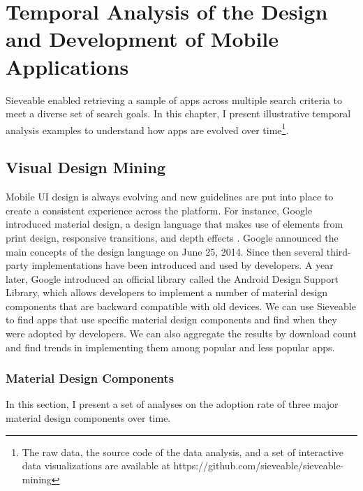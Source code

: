 \chapter{Temporal Analysis of the Design and Development of Mobile Applications}
\label{ch:findings_chapter}
Sieveable enabled retrieving a sample of apps across multiple search criteria to meet a diverse set of search goals.
In this chapter, I present illustrative temporal analysis examples to understand how apps are evolved over time\footnote{The raw data, the source code of the data analysis, and a set of interactive data visualizations are available at https://github.com/sieveable/sieveable-mining}.

\section{Visual Design Mining}

Mobile UI design is always evolving and new guidelines are put into place to create a consistent experience across the platform.
For instance, Google introduced material design, a design language that makes use of elements from print design, responsive transitions, and depth effects \cite{Google_Material_Design}.
Google announced the main concepts of the design language on June 25, 2014.
Since then several third-party implementations have been introduced and used by developers.
A year later, Google introduced an official library called the Android Design Support Library, which allows developers to implement a number of material design components that are backward compatible with old devices.
We can use Sieveable to find apps that use specific material design components and find when they were adopted by developers.
We can also aggregate the results by download count and find trends in implementing them among popular and less popular apps.

\subsection{Material Design Components}
In this section, I present a set of analyses on the adoption rate of three major material design components over time.

